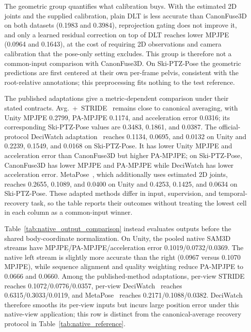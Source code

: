 \documentclass[preprint,12pt]{elsarticle}
\begin{document}
The geometric group quantifies what calibration buys. With the estimated 2D joints and the supplied calibration, plain DLT is less accurate than CanonFuse3D on both datasets (0.1983 and 0.3984), reprojection gating does not improve it, and only a learned residual correction on top of DLT reaches lower MPJPE (0.0964 and 0.1643), at the cost of requiring 2D observations and camera calibration that the pose-only setting excludes. This group is therefore not a common-input comparison with CanonFuse3D. On Ski-PTZ-Pose the geometric predictions are first centered at their own per-frame pelvis, consistent with the root-relative annotations; this preprocessing fits nothing to the test reference.

The published adaptations give a metric-dependent comparison under their stated contracts. Avg.~+~STRIDE~\cite{lal2025stride} remains close to canonical averaging, with Unity MPJPE 0.2799, PA-MPJPE 0.1174, and acceleration error 0.0316; its corresponding Ski-PTZ-Pose values are 0.3483, 0.1861, and 0.0387. The official-protocol DeciWatch adaptation~\cite{zeng2022deciwatch} reaches 0.1134, 0.0695, and 0.0132 on Unity and 0.2239, 0.1549, and 0.0168 on Ski-PTZ-Pose. It has lower Unity MPJPE and acceleration error than CanonFuse3D but higher PA-MPJPE; on Ski-PTZ-Pose, CanonFuse3D has lower MPJPE and PA-MPJPE while DeciWatch has lower acceleration error. MetaPose~\cite{usman2022metapose}, which additionally uses estimated 2D joints, reaches 0.2655, 0.1089, and 0.0400 on Unity and 0.4253, 0.1425, and 0.0634 on Ski-PTZ-Pose. These adapted methods differ in input, supervision, and temporal-recovery task, so the table reports their outcomes without treating the lowest cell in each column as a common-input winner.




Table~\ref{tab:native_output_comparison} instead evaluates outputs before the shared body-coordinate normalization. On Unity, the pooled native SAM3D streams have MPJPE/PA-MPJPE/acceleration error 0.1019/0.0732/0.0369. The native left stream is slightly more accurate than the right (0.0967 versus 0.1070 MPJPE), while sequence alignment and quality weighting reduce PA-MPJPE to 0.0666 and 0.0660. Among the published-method adaptations, per-view STRIDE~\cite{lal2025stride} reaches 0.1072/0.0776/0.0357, per-view DeciWatch~\cite{zeng2022deciwatch} reaches 0.6315/0.3033/0.0119, and MetaPose~\cite{usman2022metapose} reaches 0.2171/0.1088/0.0382. DeciWatch therefore smooths its per-view inputs but incurs large position error under this native-view application; this row is distinct from the canonical-average recovery protocol in Table~\ref{tab:native_reference}.
\end{document}
